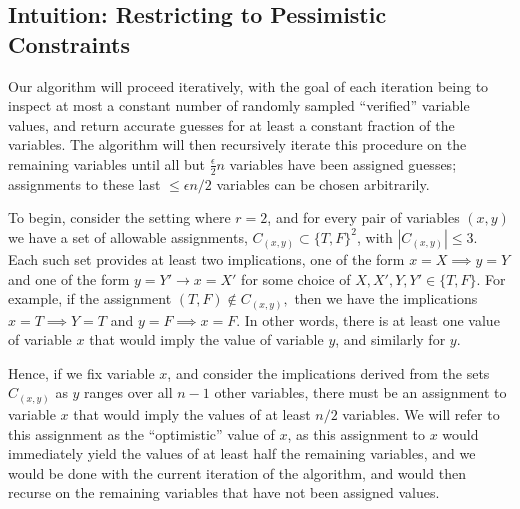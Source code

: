 \documentclass[anon,12pt]{colt2018}
\newcommand{\eps}{\epsilon}
\begin{document}




\subsection{Intuition: Restricting to Pessimistic Constraints}\label{sec:intuitP2}


Our algorithm will proceed iteratively, with the goal of each iteration being to inspect at most a constant number of randomly sampled ``verified'' variable values, and return accurate guesses for at least a constant fraction of the variables.  The algorithm will then recursively iterate this procedure on the remaining variables until all but $\frac{\eps}{2}n$ variables have been assigned guesses; assignments to these last $\le \eps n/2$ variables can be chosen arbitrarily.

To begin, consider the setting where $r=2$, and for every pair of variables $(x,y)$ we have a set of allowable assignments, $C_{(x,y)} \subset \{T,F\}^2$, with $|C_{(x,y)}| \le 3.$    Each such set provides at least two implications, one of the form $x = X \implies y = Y$ and one of the form $y=Y' \rightarrow x = X'$ for some choice of  $X,X',Y,Y' \in \{T,F\}$.  For example, if the assignment $(T,F) \not \in C_{(x,y)},$ then we have the implications $x = T \implies Y = T$ and $y=F \implies x = F$.   In other words, there is at least one value of variable $x$ that would imply the value of variable $y$, and similarly for $y$.  

Hence, if we fix variable $x$, and consider the implications derived from the sets $C_{(x,y)}$ as $y$ ranges over all $n-1$ other variables, there must be an assignment to variable $x$ that would imply the values of at least $n/2$ variables.  We will refer to this assignment as the ``optimistic'' value of $x$, as this assignment to $x$ would immediately yield the values of at least half the remaining variables, and we would be done with the current iteration of the algorithm, and would then recurse on the remaining variables that have not been assigned values.
\end{document}
